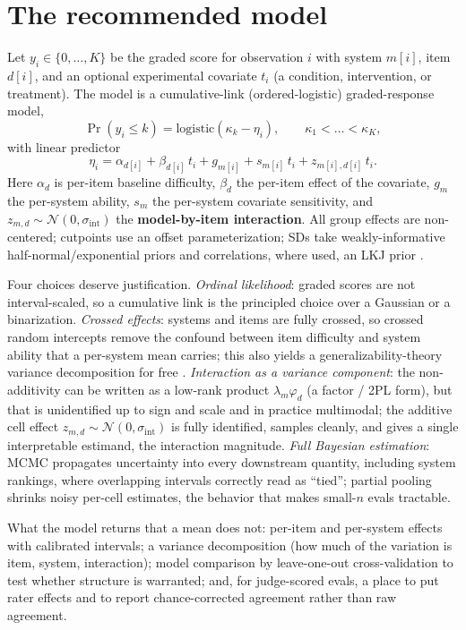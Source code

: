 \documentclass{llncs}
\begin{document}
\section{The recommended model}
\label{sec:model}

Let $y_{i}\in\{0,\dots,K\}$ be the graded score for observation $i$ with
system $m[i]$, item $d[i]$, and an optional experimental covariate $t_i$ (a
condition, intervention, or treatment). The model is a cumulative-link
(ordered-logistic) graded-response model,
\[
\Pr(y_i \le k) = \mathrm{logistic}(\kappa_k - \eta_i),\qquad
\kappa_1 < \dots < \kappa_K,
\]
with linear predictor
\[
\eta_i = \alpha_{d[i]} + \beta_{d[i]}\, t_i
       + g_{m[i]} + s_{m[i]}\, t_i
       + z_{m[i],d[i]}\, t_i .
\]
Here $\alpha_d$ is per-item baseline difficulty, $\beta_d$ the per-item
effect of the covariate, $g_m$ the per-system ability, $s_m$ the per-system
covariate sensitivity, and $z_{m,d}\sim\mathcal{N}(0,\sigma_{\text{int}})$
the \textbf{model-by-item interaction}. All group effects are non-centered;
cutpoints use an offset parameterization; SDs take weakly-informative
half-normal/exponential priors and correlations, where used, an LKJ prior
\parencite{mcelreath2020rethinking, burkner2021irt}.

Four choices deserve justification. \emph{Ordinal likelihood}: graded scores
are not interval-scaled, so a cumulative link is the principled choice over a
Gaussian or a binarization. \emph{Crossed effects}: systems and items are
fully crossed, so crossed random intercepts remove the confound between item
difficulty and system ability that a per-system mean carries; this also
yields a generalizability-theory variance decomposition for free
\parencite{brennan2001gtheory}. \emph{Interaction as a variance component}:
the non-additivity can be written as a low-rank product $\lambda_m\varphi_d$
(a factor / 2PL form), but that is unidentified up to sign and scale and in
practice multimodal; the additive cell effect $z_{m,d}\sim\mathcal{N}(0,
\sigma_{\text{int}})$ is fully identified, samples cleanly, and gives a
single interpretable estimand, the interaction magnitude. \emph{Full
Bayesian estimation}: MCMC propagates uncertainty into every downstream
quantity, including system rankings, where overlapping intervals correctly
read as ``tied''; partial pooling shrinks noisy per-cell estimates, the
behavior that makes small-$n$ evals tractable.

What the model returns that a mean does not: per-item and per-system effects
with calibrated intervals; a variance decomposition (how much of the
variation is item, system, interaction); model comparison by leave-one-out
cross-validation \parencite{vehtari2017loo} to test whether structure is
warranted; and, for judge-scored evals, a place to put rater effects and to
report chance-corrected agreement rather than raw agreement.
\end{document}

